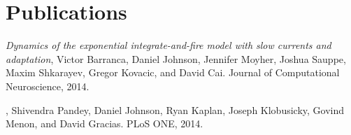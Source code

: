 \section*{\sc Publications}
{\it Dynamics of the exponential integrate-and-fire model with slow currents and adaptation}, Victor Barranca, Daniel Johnson, Jennifer Moyher, Joshua Sauppe, Maxim Shkarayev, Gregor Kovacic, and David Cai. Journal of Computational Neuroscience, 2014.

 \hspace{-18pt}{\it Self-assembly of mesoscale isomers: The role of
pathways and degrees of freedom}, Shivendra Pandey, Daniel Johnson, Ryan Kaplan, Joseph Klobusicky, Govind
Menon, and David Gracias. PLoS ONE, 2014.





